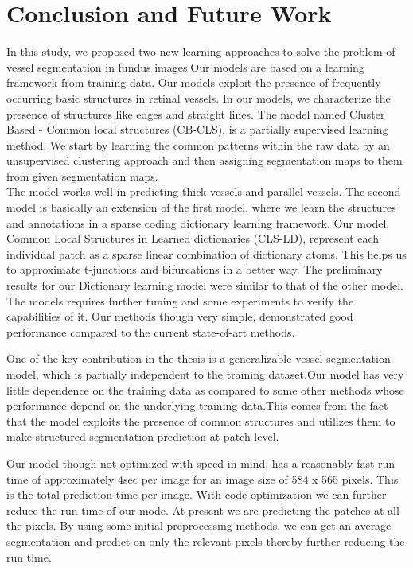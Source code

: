 \chapter{Conclusion and Future Work}  %

\ifpdf
    \graphicspath{{Chapter4/Figs/Raster/}{Chapter4/Figs/PDF/}{Chapter4/Figs/}}
\else
    \graphicspath{{Chapter4/Figs/Vector/}{Chapter4/Figs/}}
\fi
In this study, we proposed two new learning approaches to solve the problem of vessel segmentation in fundus images.Our models are based on a learning framework from training data.
Our models exploit the presence of frequently occurring basic structures in retinal vessels. In our models, we characterize the presence of structures like edges and straight lines. The model named Cluster Based - Common local structures (CB-CLS), is a partially supervised learning method. We start by learning the common patterns within the raw data by an unsupervised clustering approach and then assigning segmentation maps to them from given segmentation maps.\\
The model works well in predicting thick vessels and parallel vessels. The second model is basically an extension of the first model, where we learn the structures and annotations in a sparse coding dictionary learning framework. Our model, Common Local Structures in Learned dictionaries (CLS-LD), represent each individual patch as a sparse linear combination of dictionary atoms. This helps us to approximate t-junctions and bifurcations in a better way. The preliminary results for our Dictionary learning model were similar to that of the other model. The models requires further tuning and some experiments to verify the capabilities of it. Our methods though very simple, demonstrated good performance compared to the current state-of-art methods.

One of the key contribution in the thesis is a generalizable vessel segmentation model, which is partially independent to the training dataset.Our model has very little dependence on the training data as compared to some other methods whose performance depend on the underlying training data.This comes from the fact that the model exploits the presence of common structures and utilizes them to make structured segmentation prediction at patch level.

Our model though not optimized with speed in mind, has a reasonably fast run time of approximately 4sec per image for an image size of 584 x 565 pixels. This is the total prediction time per image.
With code optimization we can further reduce the run time of our mode. At present we are predicting the patches at all the pixels. By using some initial preprocessing methods, we can get an average segmentation and predict on only the relevant pixels thereby further reducing the run time.\\


